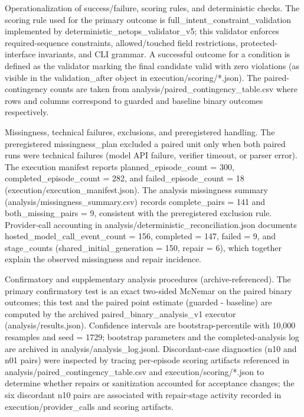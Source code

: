 \documentclass[conference]{IEEEtran}
\begin{document}
Operationalization of success/failure, scoring rules, and deterministic checks. The scoring rule used for the primary outcome is full\_intent\_constraint\_validation implemented by deterministic\_netops\_validator\_v5; this validator enforces required-sequence constraints, allowed/touched field restrictions, protected-interface invariants, and CLI grammar. A successful outcome for a condition is defined as the validator marking the final candidate valid with zero violations (as visible in the validation\_after object in execution/scoring/*.json). The paired-contingency counts are taken from analysis/paired\_contingency\_table.csv where rows and columns correspond to guarded and baseline binary outcomes respectively.

Missingness, technical failures, exclusions, and preregistered handling. The preregistered missingness\_plan excluded a paired unit only when both paired runs were technical failures (model API failure, verifier timeout, or parser error). The execution manifest reports planned\_episode\_count = 300, completed\_episode\_count = 282, and failed\_episode\_count = 18 (execution/execution\_manifest.json). The analysis missingness summary (analysis/missingness\_summary.csv) records complete\_pairs = 141 and both\_missing\_pairs = 9, consistent with the preregistered exclusion rule. Provider-call accounting in analysis/deterministic\_reconciliation.json documents hosted\_model\_call\_event\_count = 156, completed = 147, failed = 9, and stage\_counts (shared\_initial\_generation = 150, repair = 6), which together explain the observed missingness and repair incidence.

Confirmatory and supplementary analysis procedures (archive-referenced). The primary confirmatory test is an exact two-sided McNemar on the paired binary outcomes; this test and the paired point estimate (guarded - baseline) are computed by the archived paired\_binary\_analysis\_v1 executor (analysis/results.json). Confidence intervals are bootstrap-percentile with 10,000 resamples and seed = 1729; bootstrap parameters and the completed-analysis log are archived in analysis/analysis\_log.jsonl. Discordant-case diagnostics (n10 and n01 pairs) were inspected by tracing per-episode scoring artifacts referenced in analysis/paired\_contingency\_table.csv and execution/scoring/*.json to determine whether repairs or sanitization accounted for acceptance changes; the six discordant n10 pairs are associated with repair-stage activity recorded in execution/provider\_calls and scoring artifacts.
\end{document}
